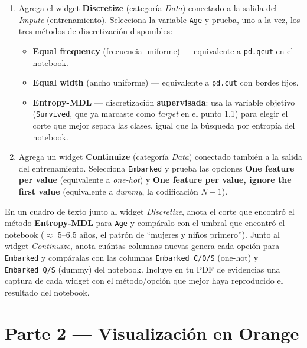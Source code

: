 \documentclass[11pt,letterpaper]{article}
\begin{document}
\begin{enumerate}[leftmargin=1.2cm]
  \item Agrega el widget \textbf{Discretize} (categoría \textit{Data}) conectado a la salida del \textit{Impute} (entrenamiento). Selecciona la variable \texttt{Age} y prueba, uno a la vez, los tres métodos de discretización disponibles:
  \begin{itemize}
    \item \textbf{Equal frequency} (frecuencia uniforme) --- equivalente a \texttt{pd.qcut} en el notebook.
    \item \textbf{Equal width} (ancho uniforme) --- equivalente a \texttt{pd.cut} con bordes fijos.
    \item \textbf{Entropy-MDL} --- discretización \textbf{supervisada}: usa la variable objetivo (\texttt{Survived}, que ya marcaste como \textit{target} en el punto 1.1) para elegir el corte que mejor separa las clases, igual que la búsqueda por entropía del notebook.
  \end{itemize}
  \item Agrega un widget \textbf{Continuize} (categoría \textit{Data}) conectado también a la salida del entrenamiento. Selecciona \texttt{Embarked} y prueba las opciones \textbf{One feature per value} (equivalente a \textit{one-hot}) y \textbf{One feature per value, ignore the first value} (equivalente a \textit{dummy}, la codificación $N-1$).
\end{enumerate}

\begin{actividad}
En un cuadro de texto junto al widget \textit{Discretize}, anota el corte que encontró el método \textbf{Entropy-MDL} para \texttt{Age} y compáralo con el umbral que encontró el notebook ($\approx$ 5--6.5 años, el patrón de ``mujeres y niños primero''). Junto al widget \textit{Continuize}, anota cuántas columnas nuevas genera cada opción para \texttt{Embarked} y compáralas con las columnas \texttt{Embarked\_C/Q/S} (one-hot) y \texttt{Embarked\_Q/S} (dummy) del notebook. Incluye en tu PDF de evidencias una captura de cada widget con el método/opción que mejor haya reproducido el resultado del notebook.
\end{actividad}

\section{Parte 2 --- Visualización en Orange}
\end{document}
